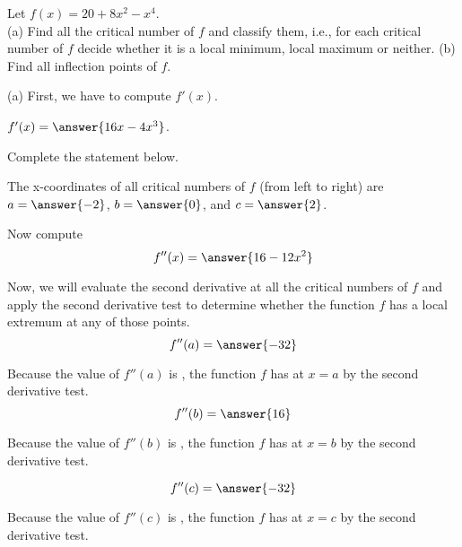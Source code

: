 \documentclass{ximera}
\begin{document}
\author{Nela Lakos}


\begin{exercise}

Let $f(x) = 20 + 8x^2 - x^4$.\\
(a) Find all the critical number of $f$ and classify them, i.e., for each critical number of $f$ decide whether it is a local minimum, local maximum or neither.
(b) Find all inflection points of $f$.

(a) First, we have to compute $f'(x)$.

$f'(x) = \answer{16x-4x^3}$.

Complete the statement below.

The  x-coordinates of all critical numbers of $f$ (from left to right) are $a=\answer{-2}$, $b=\answer{0}$, and $c=\answer{2}$.




\begin{exercise}
Now compute
\[
f''(x)=\answer{16-12x^2}
\]

Now, we will evaluate the second derivative at all the critical numbers of $f$ and apply the second derivative test to determine whether the function $f$ has a local extremum at any of those points.
\[
f''(a)=\answer{-32}
\]
\begin{exercise}
Because the value of $f''(a)$ is , the function $f$ has   at $x=a$ by the second derivative test.
\[
f''(b)=\answer{16}
\]
\begin{exercise}
Because the value of $f''(b)$ is , the function $f$ has  at $x=b$ by the second derivative test.

\[
f''(c)=\answer{-32}
\]
\begin{exercise}
Because the value of $f''(c)$ is , the function $f$ has at $x=c$  by the second derivative test.\\



\end{exercise}
\end{exercise}
\end{exercise}
\end{exercise}
\end{exercise}
\end{document}
